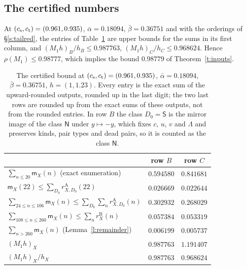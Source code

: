 \subsection{The certified numbers}\label{s:tailnumbers}

\begin{proposition}\label{p:tail}
At $(c_{\mathrm{s}}, c_{\mathrm{t}}) = (0.961, 0.935)$, $\bar\alpha = 0.18094$, $\bar\beta = 0.36751$ and with the orderings of \S\ref{s:tailred}, the entries of Table~\ref{tab:tail} are upper bounds for the sums in its first column, and $(M_1 h)_B / h_B \le 0.987763$, $(M_1 h)_C / h_C \le 0.968624$. Hence $\rho(M_1) \le 0.98777$, which implies the bound $0.98779$ of Theorem~\ref{t:inputs}.
\end{proposition}

\begin{table}[ht]
\centering
\begin{tabular}{lcc}
 & row $B$ & row $C$ \\ \hline
$\sum_{n \le 20} \mathsf m_X(n)$ (exact enumeration) & $0.594580$ & $0.841681$ \\
$\mathsf m_X(22) \le \sum_{D_0} r^{\mathrm A}_{X, D_0}(22)$ & $0.026669$ & $0.022644$ \\
$\sum_{24 \le n \le 106} \mathsf m_X(n) \le \sum_{D_0} \sum_n r^{\mathrm A}_{X, D_0}(n)$ & $0.302932$ & $0.268029$ \\
$\sum_{108 \le n \le 260} \mathsf m_X(n) \le \sum_n r^{\mathrm B}_X(n)$ & $0.057384$ & $0.053319$ \\
$\sum_{n > 260} \mathsf m_X(n)$ (Lemma~\ref{l:remainder}) & $0.006199$ & $0.005737$ \\ \hline
$(M_1 h)_X$ & $0.987763$ & $1.191407$ \\
$(M_1 h)_X / h_X$ & $0.987763$ & $0.968624$
\end{tabular}
\caption{The certified bound at $(c_{\mathrm{s}}, c_{\mathrm{t}}) = (0.961, 0.935)$, $\bar\alpha = 0.18094$, $\bar\beta = 0.36751$, $h = (1, 1.23)$. Every entry is the exact sum of the upward-rounded outputs, rounded up in the last digit; the two last rows are rounded up from the exact sums of these outputs, not from the rounded entries. In row $B$ the class $D_0 = \mathsf S$ is the mirror image of the class $\mathsf N$ under $y \mapsto -y$, which fixes $c$, $u$, $v$ and $\Lambda$ and preserves kinds, pair types and dead pairs, so it is counted as the class $\mathsf N$.}\label{tab:tail}
\end{table}

